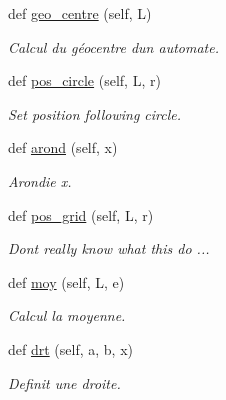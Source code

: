 \begin{DoxyCompactItemize}
def \mbox{\hyperlink{classVectorTools_1_1VectorTools_a572c397af3e343d6e53b22d8db133a12}{geo\+\_\+centre}} (self, L)
\begin{DoxyCompactList}\small\item\em Calcul du géocentre d\textquotesingle{}un automate. \end{DoxyCompactList}\item 
def \mbox{\hyperlink{classVectorTools_1_1VectorTools_ad281764327c9484eb0ab7591c7dbf8d6}{pos\+\_\+circle}} (self, L, r)
\begin{DoxyCompactList}\small\item\em Set position following circle. \end{DoxyCompactList}\item 
def \mbox{\hyperlink{classVectorTools_1_1VectorTools_a496edcc8955bd09bbcb5ebd513d9f1e4}{arond}} (self, x)
\begin{DoxyCompactList}\small\item\em Arondie x. \end{DoxyCompactList}\item 
def \mbox{\hyperlink{classVectorTools_1_1VectorTools_a4f186cc997f45614592052b5ceaa16ec}{pos\+\_\+grid}} (self, L, r)
\begin{DoxyCompactList}\small\item\em Don\textquotesingle{}t really know what this do ... \end{DoxyCompactList}\item 
\mbox{\label{classVectorTools_1_1VectorTools_a66da599d6833917a0c99cb3982b42623}} 
def \mbox{\hyperlink{classVectorTools_1_1VectorTools_a66da599d6833917a0c99cb3982b42623}{moy}} (self, L, e)
\begin{DoxyCompactList}\small\item\em Calcul la moyenne. \end{DoxyCompactList}\item 
\mbox{\label{classVectorTools_1_1VectorTools_a25f8a11061adfd39ef1f5a3b7a9329a4}} 
def \mbox{\hyperlink{classVectorTools_1_1VectorTools_a25f8a11061adfd39ef1f5a3b7a9329a4}{drt}} (self, a, b, x)
\begin{DoxyCompactList}\small\item\em Definit une droite. \end{DoxyCompactList}\item 
\mbox{\label{classVectorTools_1_1VectorTools_a80bf1bd7df2933c0edf8627aca2195bc}} 

\end{DoxyCompactItemize}

